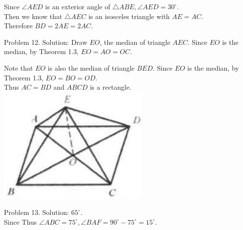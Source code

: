 \documentclass[10pt]{article}
\begin{document}
Since \(\angle A E D\) is an exterior angle of \(\triangle A B E, \angle A E D=30^{\circ}\).\\
Then we know that \(\triangle A E C\) is an isosceles triangle with \(A E=A C\).\\
Therefore \(B D=2 A E=2 A C\).

Problem 12. Solution:
Draw \(E O\), the median of triangle \(A E C\). Since \(E O\) is the median, by Theorem 1.3, \(E O=A O=O C\).


Note that \(E O\) is also the median of triangle \(B E D\). Since \(E O\) is the median, by Theorem 1.3, \(E O=B O=O D\).\\
Thus \(A C=B D\) and \(A B C D\) is a rectangle.\\
\includegraphics[max width=\textwidth, center]{2025_04_17_97bc1f7e44d93c271a88g-022}

Problem 13. Solution: \(65^{\circ}\).\\
Since Thus \(\angle A B C=75^{\circ}, \angle B A F=90^{\circ}-75^{\circ}=15^{\circ}\).
\end{document}
